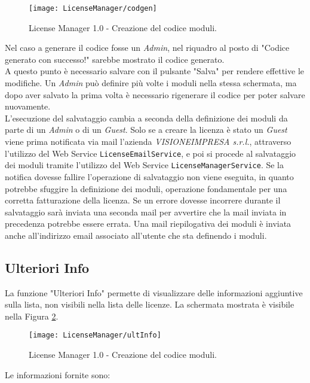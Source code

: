 \begin{figure}[!h] 
    \centering 
    \texttt{[image: LicenseManager/codgen]} 
    \caption{License Manager 1.0 - Creazione del codice moduli.}
\label{codcreat}
\end{figure}

Nel caso a generare il codice fosse un \textit{Admin}, nel riquadro al posto di "Codice generato con successo!" sarebbe mostrato il codice generato.
\\
A questo punto è necessario salvare con il pulsante "Salva" per rendere effettive le modifiche.
Un \textit{Admin} può definire più volte i moduli nella stessa schermata, ma dopo aver salvato la prima volta è necessario rigenerare il codice per poter salvare nuovamente.\\
L’esecuzione del salvataggio cambia a seconda della definizione dei moduli da parte di un \textit{Admin} o di un \textit{Guest}.
Solo se a creare la licenza è stato un \textit{Guest} viene prima notificata via mail l'azienda \textit{VISIONEIMPRESA s.r.l.}, attraverso l'utilizzo del Web Service \texttt{LicenseEmailService}, e poi si procede al salvataggio dei moduli tramite l'utilizzo del Web Service \texttt{LicenseManagerService}. Se la notifica dovesse fallire l’operazione di salvataggio non viene eseguita, in quanto potrebbe sfuggire la definizione dei moduli, operazione fondamentale per una corretta fatturazione della licenza. Se un errore dovesse incorrere durante il salvataggio sarà inviata una seconda mail per avvertire che la mail inviata in precedenza potrebbe essere errata.
Una mail riepilogativa dei moduli è inviata anche all'indirizzo email associato all'utente che sta definendo i moduli.

\newpage

\subsection{Ulteriori Info}
La funzione "Ulteriori Info" permette di visualizzare delle informazioni aggiuntive sulla lista, non visibili nella lista delle licenze.
La schermata mostrata è visibile nella Figura \ref{info}.


\begin{figure}[!h] 
    \centering 
    \texttt{[image: LicenseManager/ultInfo]} 
    \caption{License Manager 1.0 - Creazione del codice moduli.}
\label{info}
\end{figure}

Le informazioni fornite sono:

